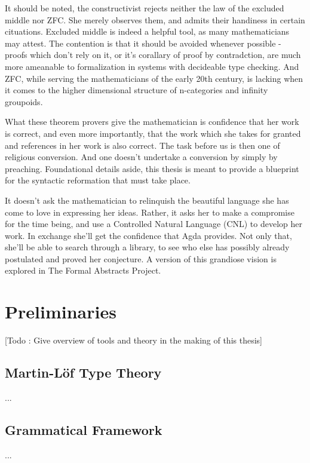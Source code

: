 \documentclass[11pt, a4paper]{article}
\begin{document}
It should be noted, the constructivist rejects neither the law of the excluded
middle nor ZFC. She merely observes them, and admits their handiness in certain
cituations. Excluded middle is indeed a helpful tool, as many mathematicians
may attest. The contention is that it should be avoided whenever possible -
proofs which don't rely on it, or it's corallary of proof by contradction, are
much more ameanable to formalization in systems with decideable type checking.
And ZFC, while serving the mathematicians of the early 20th century, is 
lacking when it comes to the higher dimensional structure of n-categories and
infinity groupoids.

What these theorem provers give the mathematician is confidence that her work
is correct, and even more importantly, that the work which she takes for
granted and references in her work is also correct. The task before us is then
one of religious conversion. And one doesn't undertake a conversion by simply
by preaching. Foundational details aside, this thesis is meant to provide a
blueprint for the syntactic reformation that must take place.  

It doesn't ask the mathematician to relinquish the beautiful language she has
come to love in expressing her ideas.  Rather, it asks her to make a compromise
for the time being, and use a Controlled Natural Language (CNL) to develop her
work. In exchange she'll get the confidence that Agda provides. Not only that,
she'll be able to search through a library, to see who else has possibly
already postulated and proved her conjecture. A version of this grandiose vision is 
explored in The Formal Abstracts Project.

\section{Preliminaries}

[Todo : Give overview of tools and theory in the making of this thesis]

\subsection{Martin-Löf Type Theory}

...

\subsection{Grammatical Framework}

...
\end{document}
